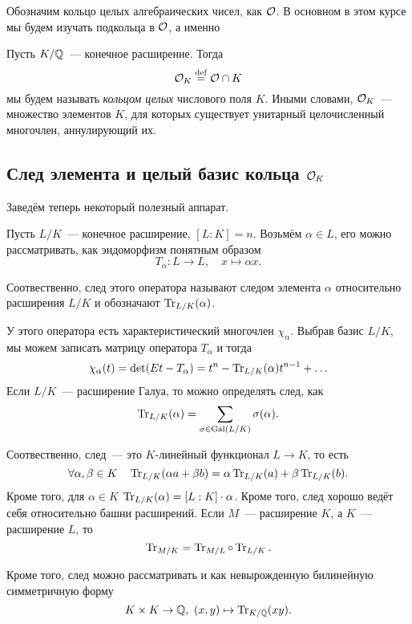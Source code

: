 	Обозначим кольцо целых алгебраических чисел, как $\mathcal{O}$. В основном в этом курсе мы будем изучать подкольца в $\mathcal{O}$, а именно

	\begin{definition} 
		Пусть $K/\mathbb{Q}$~--- конечное расширение. Тогда 
		\[
			\mathcal{O}_{K} \stackrel{\mathrm{def}}{=} \mathcal{O} \cap K
		\]
		мы будем называть \emph{кольцом целых} числового поля $K$. Иными словами, $\mathcal{O}_{K}$~--- множество элементов $K$, для которых существует унитарный целочисленный многочлен, аннулирующий их. 
	\end{definition}

	\subsection{След элемента и целый базис кольца $\mathcal{O}_{K}$}

	Заведём теперь некоторый полезный аппарат. 

	\begin{definition} 
		Пусть $L/K$~--- конечное расширение, $[L : K] = n$. Возьмём $\alpha \in L$, его можно рассматривать, как эндоморфизм понятным образом
		\[
			T_{\alpha}\colon L \to L, \quad x \mapsto \alpha x. 
		\]

		Соотвественно, след этого оператора называют следом элемента $\alpha$ относительно расширения $L/K$ и обозначают $\operatorname{Tr}_{L/K}(\alpha)$.

		У этого оператора есть характеристический многочлен $\chi_{\alpha}$. Выбрав базис $L/K$, мы можем записать матрицу оператора $T_{\alpha}$  и тогда 
		\[
			\chi_{\alpha}(t) = \det\lr*{Et - T_{\alpha}} = t^n - \Tr_{L/K}(\alpha)t^{n - 1} + \ldots 
		\]
		Если $L/K$~--- расширение Галуа, то можно определять след, как 
		\[
			\operatorname{Tr}_{L/K}(\alpha) = \sum_{\sigma \in \operatorname{Gal}(L/K)} \sigma(\alpha).
		\]
	\end{definition}

	Соотвественно, след~--- это $K$-линейный функционал $L \to K$, то есть 
	\[
		\forall \alpha, \beta \in K \quad \operatorname{Tr}_{L/K}(\alpha a + \beta b) = \alpha \operatorname{Tr}_{L/K}(a) + \beta \operatorname{Tr}_{L/K}(b).
	\]
	Кроме того, для $\alpha \in K$ $\operatorname{Tr}_{L/K}(\alpha) = [L : K] \cdot \alpha$. Кроме того, след хорошо ведёт себя относительно башни расширений. Если $M$~--- расширение $K$, а $K$~--- расширение $L$, то 
	\[
		\operatorname{Tr}_{M/K} = \operatorname{Tr}_{M/L} \circ \operatorname{Tr}_{L/K}.
	\]

	Кроме того, след можно рассматривать и как невырожденную билинейную симметричную форму 
	\[
		K \times K \to \mathbb{Q}, \ (x, y) \mapsto \operatorname{Tr}_{K/\mathbb{Q}}(xy).
	\]

